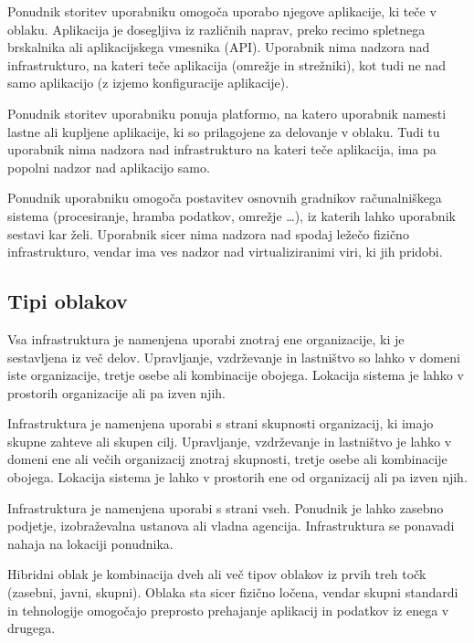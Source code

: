 \documentclass[12pt,a4paper,openany,tikz]{book}
\theoremstyle{plain}
\theoremstyle{definition}
\begin{document}
\begin{description}[style=nextline]
	\item[\gls{SaaS}] Ponudnik storitev uporabniku omogoča uporabo njegove aplikacije, ki teče v oblaku. Aplikacija je dosegljiva iz različnih naprav, preko recimo spletnega brskalnika ali aplikacijskega vmesnika (API). Uporabnik nima nadzora nad infrastrukturo, na kateri teče aplikacija (omrežje in strežniki), kot tudi ne nad samo aplikacijo (z izjemo konfiguracije aplikacije).

	\item[\gls{PaaS}] Ponudnik storitev uporabniku ponuja platformo, na katero uporabnik namesti lastne ali kupljene aplikacije, ki so prilagojene za delovanje v oblaku. Tudi tu uporabnik nima nadzora nad infrastrukturo na kateri teče aplikacija, ima pa popolni nadzor nad aplikacijo samo.

	\item[\gls{IaaS}] Ponudnik uporabniku omogoča postavitev osnovnih gradnikov računalniškega sistema (procesiranje, hramba podatkov, omrežje …), iz katerih lahko uporabnik sestavi kar želi. Uporabnik sicer nima nadzora nad spodaj ležečo fizično infrastrukturo, vendar ima ves nadzor nad virtualiziranimi viri, ki jih pridobi.
\end{description}

\subsection*{Tipi oblakov}
\label{sub:Tipi oblakov}
\begin{description}[style=nextline]
	\item[Zasebni oblak] Vsa infrastruktura je namenjena uporabi znotraj ene organizacije, ki je sestavljena iz več delov. Upravljanje, vzdrževanje in lastništvo so lahko v domeni iste organizacije, tretje osebe ali kombinacije obojega. Lokacija sistema je lahko v prostorih organizacije ali pa izven njih.

	\item[Skupni oblak] Infrastruktura je namenjena uporabi s strani skupnosti organizacij, ki imajo skupne zahteve ali skupen cilj. Upravljanje, vzdrževanje in lastništvo je lahko v domeni ene ali večih organizacij znotraj skupnosti, tretje osebe ali kombinacije obojega. Lokacija sistema je lahko v prostorih ene od organizacij ali pa izven njih.

	\item[Javni oblak] Infrastruktura je namenjena uporabi s strani vseh. Ponudnik je lahko zasebno podjetje, izobraževalna ustanova ali vladna agencija. Infrastruktura se ponavadi nahaja na lokaciji ponudnika.

  \item[Hibridni oblak] Hibridni oblak je kombinacija dveh ali več tipov oblakov iz prvih treh točk (zasebni, javni, skupni). Oblaka sta sicer fizično ločena, vendar skupni standardi in tehnologije omogočajo preprosto prehajanje aplikacij in podatkov iz enega v drugega.
\end{description}
\end{document}

